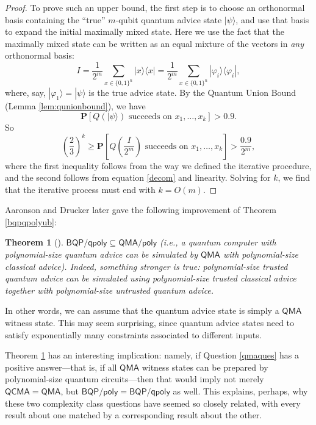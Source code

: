 \documentclass[12pt]{report}
\theoremstyle{plain}
\newtheorem{theorem}{Theorem}[section]
\theoremstyle{definition}
\renewcommand{\Pr}{\mathbf{P}}
\renewcommand{\ket}[1]{|#1\rangle}
\newcommand{\ketbra}[2]{|#1\rangle\!\langle#2|}
\begin{document}
\begin{proof}
To prove such an upper bound, the first step is to choose an orthonormal basis containing the ``true'' $m$-qubit quantum advice state $\ket{\psi}$, and use that basis to expand the initial maximally mixed state.  Here we use the fact that the maximally mixed state can be written as an equal mixture of the vectors in {\em any} orthonormal basis:
\begin{equation}
\label{decom}
  I = \frac{1}{2^m} \sum_{x \in \{ 0, 1 \}^n} \ketbra{x}{x} =
  \frac{1}{2^m} \sum_{x \in \{ 0, 1 \}^n} \ketbra{\varphi_i }{ \varphi_i },
\end{equation}
where, say, $\ket{\varphi_1} = \ket{\psi}$ is the true advice state.
By the Quantum Union Bound (Lemma \ref{lem:qunionbound}), we have
$$\Pr [ Q ( \ket{\psi}) \text{ succeeds on } x_1,
\ldots, x_k] > 0.9.$$
So
$$\left( \frac{2}{3} \right)^k \geq \Pr\left[ Q \left( \frac{I}{2^m}\right) \text{ succeeds on } x_1, \ldots, x_k \right] > \frac{0.9}{2^m},$$
where the first inequality follows from the way we defined the iterative procedure, and the second follows from equation \ref{decom} and linearity.  Solving for $k$, we find that the iterative process
must end with $k = O ( m)$.
\end{proof}

Aaronson and Drucker \cite{AD14} later gave the following improvement of Theorem \ref{bqpqpolyub}:
\begin{theorem}[\cite{AD14}]
\label{adruckerthm}
$\mathsf{BQP/qpoly} \subseteq \mathsf{QMA/poly}$ (i.e.,  a quantum computer with polynomial-size quantum advice can be
  simulated by $\mathsf{QMA}$ with polynomial-size {\em classical} advice).  Indeed, something stronger is true: polynomial-size
  trusted quantum advice can be simulated using polynomial-size trusted classical advice together with polynomial-size {\em untrusted} quantum advice.
\end{theorem}
In other words, we can assume that the quantum advice state is simply a $\mathsf{QMA}$ witness state.
This may seem surprising, since quantum advice states need to satisfy exponentially many constraints associated to different inputs.

Theorem \ref{adruckerthm} has an interesting implication: namely, if Question \ref{qmaques} has a positive answer---that is, if all $\mathsf{QMA}$ witness states can be prepared by polynomial-size quantum circuits---then that would imply not merely $\mathsf{QCMA} = \mathsf{QMA}$, but $\mathsf{BQP/poly} = \mathsf{BQP/qpoly}$ as well.  This explains, perhaps, why these two complexity class questions have seemed so closely related, with every result about one matched by a corresponding result about the other.
\end{document}
